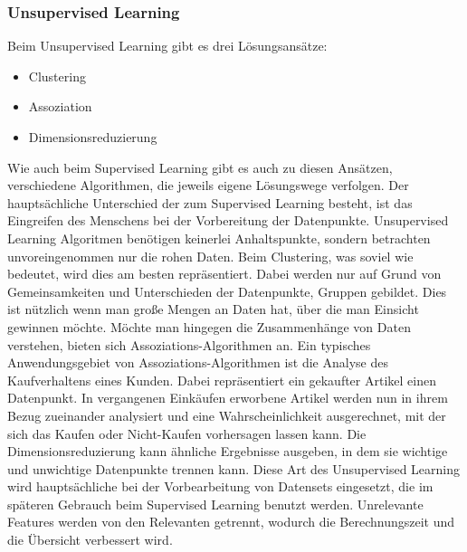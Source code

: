 \documentclass[12pt,german,ngerman]{report}
\begin{document}
        \subsubsection{Unsupervised Learning}
            Beim Unsupervised Learning gibt es drei Lösungsansätze:\cite{unsupervisedlearning2021ibm}
            \begin{itemize}
                \item{Clustering}
                \item{Assoziation}
                \item{Dimensionsreduzierung}
            \end{itemize}
            Wie auch beim Supervised Learning gibt es auch zu diesen Ansätzen, verschiedene
            Algorithmen, die jeweils eigene Lösungswege verfolgen.
            Der hauptsächliche Unterschied der zum Supervised Learning besteht, ist das Eingreifen
            des Menschens bei der Vorbereitung der Datenpunkte. Unsupervised Learning Algoritmen
            benötigen keinerlei Anhaltspunkte, sondern betrachten unvoreingenommen  nur die rohen Daten.
            Beim Clustering, was soviel wie  bedeutet, wird dies am besten repräsentiert.
            Dabei werden nur auf Grund von Gemeinsamkeiten und Unterschieden der Datenpunkte, Gruppen gebildet.\cite{clustering2021elementai}
            Dies ist nützlich wenn man große Mengen an Daten hat, über die man Einsicht gewinnen möchte.
            Möchte man hingegen die Zusammenhänge von Daten verstehen, 
            bieten sich Assoziations-Algorithmen an.\cite{apriori2019sciencedata}
            Ein typisches Anwendungsgebiet von Assoziations-Algorithmen ist die Analyse des Kaufverhaltens eines Kunden.
            Dabei repräsentiert ein gekaufter Artikel einen Datenpunkt. 
            In vergangenen Einkäufen erworbene Artikel werden nun 
            in ihrem Bezug zueinander analysiert und eine Wahrscheinlichkeit ausgerechnet, mit der sich
            das Kaufen oder Nicht-Kaufen vorhersagen lassen kann. Die Dimensionsreduzierung kann
            ähnliche Ergebnisse ausgeben, in dem sie wichtige und unwichtige Datenpunkte trennen kann.
            Diese Art des Unsupervised Learning wird hauptsächliche bei der Vorbearbeitung von Datensets eingesetzt,
            die im späteren Gebrauch beim Supervised Learning benutzt werden.\cite{unsupervisedlearning2021ibm}
            Unrelevante Features werden von den Relevanten getrennt, wodurch die Berechnungszeit und die Übersicht
            verbessert wird.
            
\end{document}
